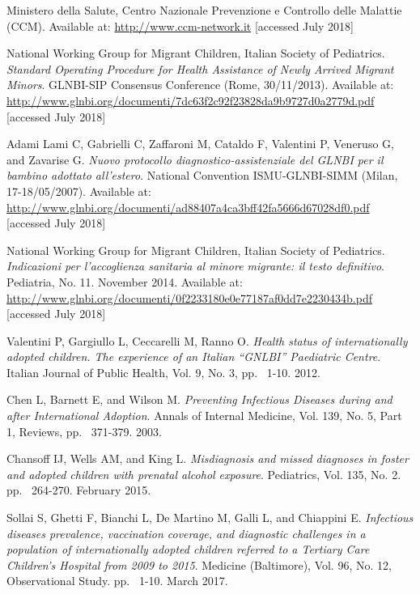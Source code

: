 \begin{thebibliography}{50}
  Ministero della Salute, Centro Nazionale Prevenzione e Controllo delle Malattie (CCM).  
  Available at: \url{http://www.ccm-network.it} [accessed July 2018]
  
  National Working Group for Migrant Children, Italian Society of Pediatrics.
  \textit{Standard Operating Procedure for Health Assistance of Newly Arrived Migrant Minors}.
  GLNBI-SIP Consensus Conference (Rome, 30/11/2013).
  Available at: \url{http://www.glnbi.org/documenti/7dc63f2c92f23828da9b9727d0a2779d.pdf} [accessed July 2018]
  
  Adami Lami C, Gabrielli C, Zaffaroni M, Cataldo F, Valentini P, Veneruso G, and Zavarise G.
  \textit{Nuovo protocollo diagnostico-assistenziale del GLNBI per il bambino adottato all'estero}.
   National Convention ISMU-GLNBI-SIMM (Milan, 17-18/05/2007).
  Available at: \url{http://www.glnbi.org/documenti/ad88407a4ca3bff42fa5666d67028df0.pdf} [accessed July 2018]
  
  National Working Group for Migrant Children, Italian Society of Pediatrics.
  \textit{Indicazioni per l’accoglienza sanitaria al minore migrante: il testo definitivo}.
  Pediatria, No. 11.
  November 2014.
  Available at: \url{http://www.glnbi.org/documenti/0f2233180e0e77187af0dd7e2230434b.pdf} [accessed July 2018]
  
  Valentini P, Gargiullo L, Ceccarelli M, Ranno O.
  \textit{Health status of internationally adopted children. The experience of an Italian “GNLBI” Paediatric Centre}.
  Italian Journal of Public Health, Vol. 9, No. 3,
  pp. ~1-10.
  2012.
  
  Chen L, Barnett E, and Wilson M.
  \textit{Preventing Infectious Diseases during and after International Adoption}.
  Annals of Internal Medicine, Vol. 139, No. 5, Part 1,
  Reviews,
  pp. ~371-379.
  2003.
  
  Chansoff IJ, Wells AM, and King L.
  \textit{Misdiagnosis and missed diagnoses in foster and adopted children with prenatal alcohol exposure}.
  Pediatrics, Vol. 135, No. 2.
  pp. ~264-270.
  February 2015.
  
  Sollai S, Ghetti F, Bianchi L, De Martino M, Galli L, and Chiappini E.
  \textit{Infectious diseases prevalence, vaccination coverage, and diagnostic challenges in a population of internationally adopted children referred to a Tertiary Care Children’s Hospital from 2009 to 2015}.
  Medicine (Baltimore), Vol. 96, No. 12,
  Observational Study.
  pp. ~1-10.
  March 2017.
  

\end{thebibliography}
